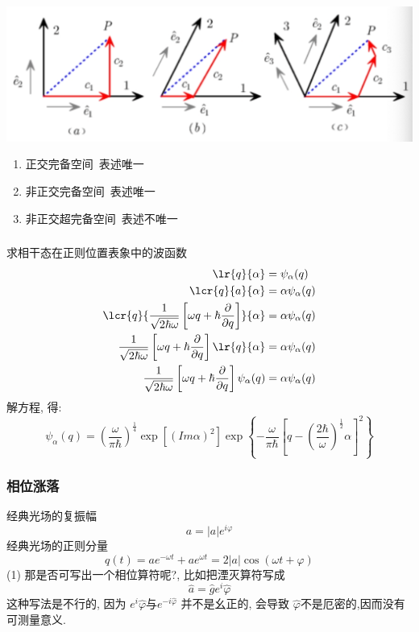 \begin{frame} 
 \frametitle{}
        \begin{center}
             \includegraphics[width=1.0\textwidth]{figs/2022-05-11-11-10-06.png}
        \end{center}
    \begin{enumerate}
        \item 正交完备空间~表述唯一
        \item 非正交完备空间~表述唯一
        \item 非正交超完备空间~表述不唯一
    \end{enumerate}
\end{frame}

\begin{frame}  
 \frametitle{}
    求相干态在正则位置表象中的波函数
    \[ \begin{aligned}
       \lr{q}{\alpha} & = \psi_\alpha(q) \\
       \lcr{q}{a}{\alpha} & = \alpha\psi_\alpha(q) \\
       \lcr{q}{\frac{1}{\sqrt{2\hbar \omega}}\left[ \omega q +\hbar \frac{\partial }{\partial q}\right]}{\alpha} & = \alpha\psi_\alpha(q) \\
       \frac{1}{\sqrt{2\hbar \omega}}\left[ \omega q +\hbar \frac{\partial }{\partial q}\right]\lr{q}{\alpha} & = \alpha\psi_\alpha(q) \\ 
       \frac{1}{\sqrt{2\hbar \omega}}\left[ \omega q +\hbar \frac{\partial }{\partial q}\right]\psi_\alpha(q) & = \alpha\psi_\alpha(q)\\   
    \end{aligned}\]  
解方程, 得:
\[\psi_\alpha(q) = (\frac{\omega}{\pi \hbar})^\frac{1}{4} \exp{[(Im \alpha)^2]}\exp\left\{ -\frac{\omega}{\pi \hbar} \left[ q-(\frac{2 \hbar}{\omega})^\frac{1}{2} \alpha \right]^2 \right\} \]
\end{frame}

\begin{frame} 
    \frametitle{相位涨落}
         经典光场的复振幅 
         \[ a= \left|a\right| e^{i\varphi}\]
         经典光场的正则分量
         \[ q(t) = a e^{-\omega t} + a e^{\omega t} = 2\left|a \right|\cos(\omega t + \varphi)\]
         (1) 那是否可写出一个相位算符呢?, 比如把湮灭算符写成
         \[ \hat{a} = \hat{g} e ^ i \hat{\varphi} \]
         这种写法是不行的, 因为
         $e ^ i \hat{\varphi}$与$e ^ {-i \hat{\varphi}}$ 并不是幺正的, 会导致 $\hat{\varphi}$不是厄密的,因而没有可测量意义. 
\end{frame}

